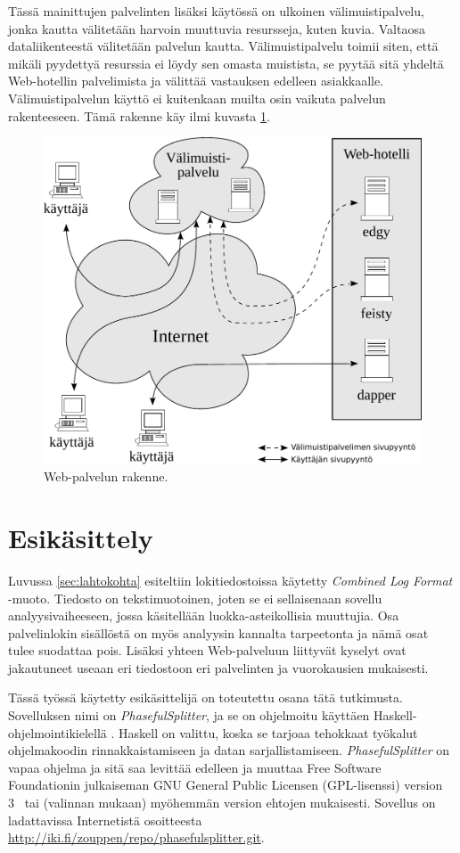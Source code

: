 Tässä mainittujen palvelinten lisäksi käytössä on ulkoinen
välimuistipalvelu, jonka kautta välitetään harvoin muuttuvia
resursseja, kuten kuvia. Valtaosa dataliikenteestä
välitetään palvelun kautta. Välimuistipalvelu toimii siten, että
mikäli pyydettyä resurssia ei löydy sen omasta muistista, se pyytää
sitä yhdeltä Web-hotellin palvelimista ja välittää vastauksen edelleen
asiakkaalle. Välimuistipalvelun käyttö ei kuitenkaan muilta osin
vaikuta palvelun rakenteeseen. Tämä rakenne käy ilmi kuvasta
\ref{palvelinrakenne}.

\begin{figure}[htp]
\centering
\includegraphics[width=12cm]{pics/palvelinrakenne.pdf}
\caption{Web-palvelun rakenne.}
\label{palvelinrakenne}
\end{figure}

\section{Esikäsittely}

Luvussa \ref{sec:lahtokohta} esiteltiin lokitiedostoissa käytetty
\textit{Combined Log Format} -muoto. Tiedosto on tekstimuotoinen,
joten se ei sellaisenaan sovellu analyysivaiheeseen, jossa käsitellään
luokka-asteikollisia muuttujia. Osa palvelinlokin sisällöstä on myös analyysin kannalta
tarpeetonta ja nämä osat tulee suodattaa pois. Lisäksi yhteen
Web-palveluun liittyvät kyselyt ovat jakautuneet useaan eri
tiedostoon eri palvelinten ja vuorokausien mukaisesti.

Tässä työssä käytetty esikäsittelijä on toteutettu osana tätä tutkimusta. Sovelluksen 
nimi on \textit{PhasefulSplitter}, ja se on ohjelmoitu käyttäen
Haskell-ohjelmointikielellä \cite{haskell98}. Haskell on valittu, koska se tarjoaa
tehokkaat työkalut ohjelmakoodin rinnakkaistamiseen ja datan
sarjallistamiseen. \textit{PhasefulSplitter} on vapaa ohjelma ja sitä saa
levittää edelleen ja muuttaa Free Software Foundationin julkaiseman
GNU General Public Licensen (GPL-lisenssi) version 3~\cite{gplv3} tai (valinnan
mukaan) myöhemmän version ehtojen mukaisesti. Sovellus on
ladattavissa Internetistä osoitteesta \\
\url{http://iki.fi/zouppen/repo/phasefulsplitter.git}.

